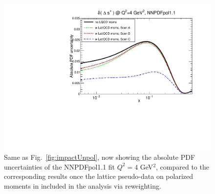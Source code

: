 \begin{figure}[!t]
\includegraphics[scale=0.45]{plots/xsp-pol-lattice-relerr.pdf}
\caption{\small Same as Fig.~\ref{fig:impactUnpol}, now
  showing the absolute PDF uncertainties of the NNPDFpol1.1 fit
   $Q^2=4$ GeV$^2$,
  compared to the corresponding results once the lattice pseudo-data
  on polarized moments in included in the analysis via
  reweighting.
}    
\label{fig:impactPol}
\end{figure}


\clearpage
